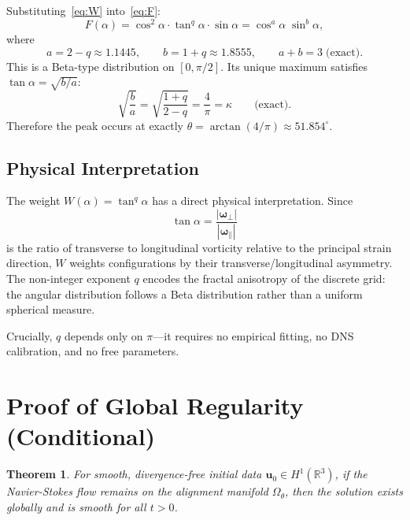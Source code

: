 \documentclass[11pt,a4paper]{article}
\newcommand{\R}{\mathbb{R}}
\newcommand{\kap}{\kappa}
\newtheorem{theorem}{Theorem}
\begin{document}
Substituting~\eqref{eq:W} into~\eqref{eq:F}:
\begin{equation}\label{eq:Fclosed}
  F(\alpha) = \cos^2\!\alpha\cdot\tan^q\!\alpha\cdot\sin\alpha
            = \cos^a\!\alpha\;\sin^b\!\alpha,
\end{equation}
where
\begin{equation}\label{eq:ab}
  a = 2-q \approx 1.1445,
  \qquad b = 1+q \approx 1.8555,
  \qquad a+b=3 \;\text{(exact)}.
\end{equation}
This is a Beta-type distribution on $[0,\pi/2]$. Its unique maximum satisfies $\tan\alpha=\sqrt{b/a}$:
\begin{equation}\label{eq:peak}
  \sqrt{\frac{b}{a}} = \sqrt{\frac{1+q}{2-q}} = \frac{4}{\pi} = \kap
  \qquad\text{(exact).}
\end{equation}
Therefore the peak occurs at exactly $\theta=\arctan(4/\pi)\approx51.854^\circ$.

\subsection{Physical Interpretation}

The weight $W(\alpha)=\tan^q\!\alpha$ has a direct physical interpretation. Since
\[
  \tan\alpha = \frac{|\bm{\omega}_\perp|}{|\bm{\omega}_\parallel|}
\]
is the ratio of transverse to longitudinal vorticity relative to the principal strain direction, $W$ weights configurations by their transverse/longitudinal asymmetry. The non-integer exponent $q$ encodes the fractal anisotropy of the discrete grid: the angular distribution follows a Beta distribution rather than a uniform spherical measure.

Crucially, $q$ depends only on $\pi$---it requires no empirical fitting, no DNS calibration, and no free parameters.

\section{Proof of Global Regularity (Conditional)}

\begin{theorem}\label{thm:main}
For smooth, divergence-free initial data $\bm{u}_0\in H^1(\R^3)$, if the Navier-Stokes flow remains on the alignment manifold $\Omega_\theta$, then the solution exists globally and is smooth for all $t>0$.
\end{theorem}
\end{document}
